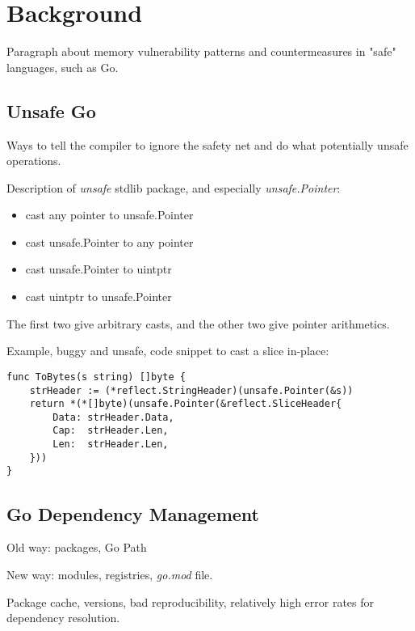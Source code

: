 \section{Background}
\label{sec:background}

Paragraph about memory vulnerability patterns and countermeasures in "safe" languages, such as Go.

\subsection{Unsafe Go}

Ways to tell the compiler to ignore the safety net and do what potentially unsafe operations.

Description of \textit{unsafe} stdlib package, and especially \textit{unsafe.Pointer}:

\begin{itemize}
    \item cast any pointer to unsafe.Pointer
    \item cast unsafe.Pointer to any pointer
    \item cast unsafe.Pointer to uintptr
    \item cast uintptr to unsafe.Pointer
\end{itemize}

The first two give arbitrary casts, and the other two give pointer arithmetics.

Example, buggy and unsafe, code snippet to cast a slice in-place:

\begin{lstlisting}[language=Golang, label=lst:unsafe-example, caption=Example buggy unsafe Go code]
func ToBytes(s string) []byte {
    strHeader := (*reflect.StringHeader)(unsafe.Pointer(&s))
    return *(*[]byte)(unsafe.Pointer(&reflect.SliceHeader{
        Data: strHeader.Data,
        Cap:  strHeader.Len,
        Len:  strHeader.Len,
    }))
}
\end{lstlisting}


\subsection{Go Dependency Management}

Old way: packages, Go Path

New way: modules, registries, \textit{go.mod} file.

Package cache, versions, bad reproducibility, relatively high error rates for dependency resolution.

